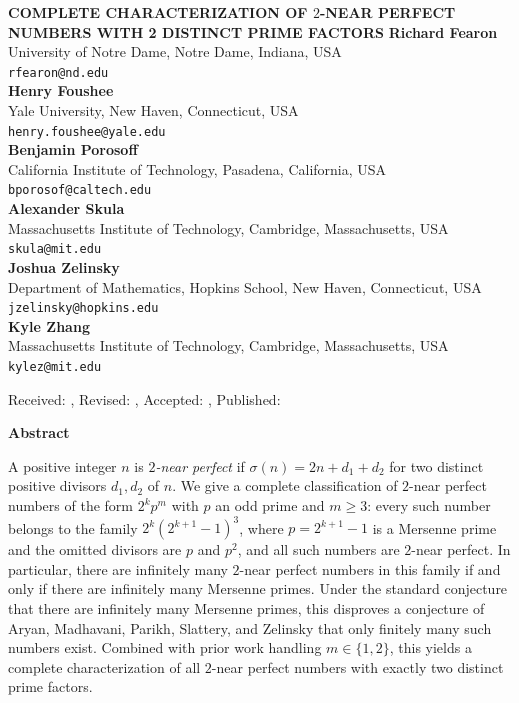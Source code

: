 \documentclass[10pt]{article}
\theoremstyle{definition}
\begin{document}
\begin{center}
\uppercase{\bf \boldmath Complete characterization of $2$-near perfect numbers with 2 distinct prime factors}
\vskip 20pt
{\bf Richard Fearon}\\
{\smallit University of Notre Dame, Notre Dame, Indiana, USA}\\
{\tt rfearon@nd.edu}\\
\vskip 10pt
{\bf Henry Foushee}\\
{\smallit Yale University, New Haven, Connecticut, USA}\\
{\tt henry.foushee@yale.edu}\\
\vskip 10pt
{\bf Benjamin Porosoff}\\ %
{\smallit California Institute of Technology, Pasadena, California, USA}\\
{\tt bporosof@caltech.edu}\\
\vskip 10pt
{\bf Alexander Skula}\\
{\smallit Massachusetts Institute of Technology, Cambridge, Massachusetts, USA}\\
{\tt skula@mit.edu}\\
\vskip 10pt
{\bf Joshua Zelinsky}\\
{\smallit Department of Mathematics, Hopkins School, New Haven, Connecticut, USA}\\
{\tt jzelinsky@hopkins.edu}\\
\vskip 10pt
{\bf Kyle Zhang}\\
{\smallit Massachusetts Institute of Technology, Cambridge, Massachusetts, USA}\\
{\tt kylez@mit.edu}\\
\end{center}
\vskip 20pt
\centerline{\smallit Received: , Revised: , Accepted: , Published: } %
\vskip 30pt

\centerline{\bf Abstract}
\noindent
A positive integer $n$ is \emph{$2$-near perfect} if $\sigma(n)=2n+d_1+d_2$ for two distinct positive divisors $d_1,d_2$ of $n$. We give a complete classification of $2$-near perfect numbers of the form $2^kp^m$ with $p$ an odd prime and $m\ge3$: every such number belongs to the family $2^k(2^{k+1}-1)^3$, where $p=2^{k+1}-1$ is a Mersenne prime and the omitted divisors are $p$ and $p^2$, and all such numbers are $2$-near perfect. In particular, there are infinitely many $2$-near perfect numbers in this family if and only if there are infinitely many Mersenne primes. Under the standard conjecture that there are infinitely many Mersenne primes, this disproves a conjecture of Aryan, Madhavani, Parikh, Slattery, and Zelinsky that only finitely many such numbers exist. Combined with prior work handling $m\in\{1,2\}$, this yields a complete characterization of all $2$-near perfect numbers with exactly two distinct prime factors.
\end{document}
